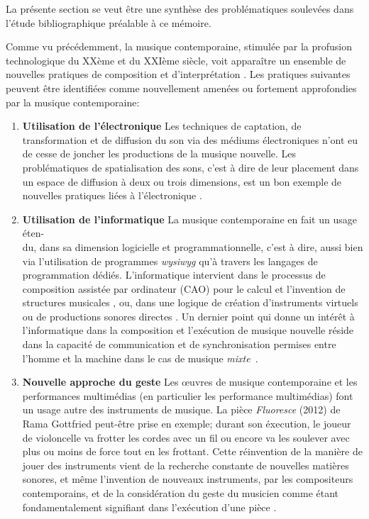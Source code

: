 La présente section se veut être une synthèse des problématiques soulevées dans l'étude bibliographique préalable à ce mémoire.

Comme vu précédemment, la musique contemporaine, stimulée par la profusion technologique du XXème et du XXIème siècle, voit apparaître un ensemble de nouvelles pratiques de composition et d'interprétation \cite{bosseur2005}.
Les pratiques suivantes peuvent être identifiées comme nouvellement amenées ou fortement approfondies par la musique contemporaine:

\begin{enumerate}[label={(\arabic*)}]
	\item \textbf{Utilisation de l'électronique} Les techniques de captation, de transformation et de diffusion du son via des médiums électroniques n'ont eu de cesse de joncher les productions de la musique nouvelle.
	Les problématiques de spatialisation des sons, c'est à dire de leur placement dans un espace de diffusion à deux ou trois dimensions, est un bon exemple de nouvelles pratiques liées à l'électronique \cite{harley1993}.
	
	\item \textbf{Utilisation de l'informatique} La musique contemporaine en fait un usage éten-\\du, dans sa dimension logicielle et programmationnelle, c'est à dire, aussi bien via l'utilisation de programmes \textit{wysiwyg} qu'à travers les langages de programmation dédiés. L'informatique intervient dans le processus de composition assistée par ordinateur (CAO) pour le calcul et l'invention de structures musicales \cite{agon1998}, ou, dans une logique de création d'instruments virtuels ou de productions sonores directes \cite{puckette1991, mccartney1996}. Un dernier point qui donne un intérêt à l'informatique dans la composition et l'exécution de musique nouvelle réside dans la capacité de communication et de synchronisation permises entre l'homme et la machine dans le cas de musique \textit{mixte}~\cite{cont2008}.
	
	\item \textbf{Nouvelle approche du geste} Les œuvres de musique contemporaine et les performances multimédias (en particulier les performance multimédias) font un usage autre des instruments de musique. La pièce \textit{Fluoresce} (2012) de Rama Gottfried peut-être prise en exemple; durant son éxecution, le joueur de violoncelle va frotter les cordes avec un fil ou encore va les soulever avec plus ou moins de force tout en les frottant. Cette réinvention de la manière de jouer des instruments vient de la recherche constante de nouvelles matières sonores, et même l'invention de nouveaux instruments, par les compositeurs contemporains, et de la considération du geste du musicien comme étant fondamentalement signifiant dans l'exécution d'une pièce \cite{zanpronha2005}.
	

\end{enumerate}

